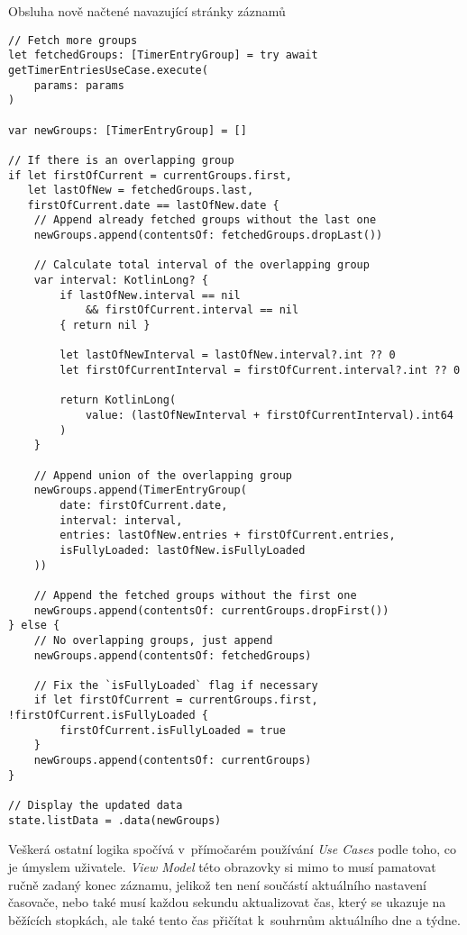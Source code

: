 \begin{listing}
\caption{Obsluha nově načtené navazující stránky záznamů}\label{code:view-mode-entry-group-overlap}
\begin{verbatim}
// Fetch more groups
let fetchedGroups: [TimerEntryGroup] = try await getTimerEntriesUseCase.execute(
    params: params
)

var newGroups: [TimerEntryGroup] = []

// If there is an overlapping group
if let firstOfCurrent = currentGroups.first,
   let lastOfNew = fetchedGroups.last,
   firstOfCurrent.date == lastOfNew.date {
    // Append already fetched groups without the last one
    newGroups.append(contentsOf: fetchedGroups.dropLast())
    
    // Calculate total interval of the overlapping group
    var interval: KotlinLong? {
        if lastOfNew.interval == nil 
            && firstOfCurrent.interval == nil 
        { return nil }
        
        let lastOfNewInterval = lastOfNew.interval?.int ?? 0
        let firstOfCurrentInterval = firstOfCurrent.interval?.int ?? 0
        
        return KotlinLong(
            value: (lastOfNewInterval + firstOfCurrentInterval).int64
        )
    }
    
    // Append union of the overlapping group
    newGroups.append(TimerEntryGroup(
        date: firstOfCurrent.date,
        interval: interval,
        entries: lastOfNew.entries + firstOfCurrent.entries,
        isFullyLoaded: lastOfNew.isFullyLoaded
    ))
    
    // Append the fetched groups without the first one
    newGroups.append(contentsOf: currentGroups.dropFirst())
} else {
    // No overlapping groups, just append
    newGroups.append(contentsOf: fetchedGroups)
    
    // Fix the `isFullyLoaded` flag if necessary
    if let firstOfCurrent = currentGroups.first, !firstOfCurrent.isFullyLoaded {
        firstOfCurrent.isFullyLoaded = true
    }
    newGroups.append(contentsOf: currentGroups)
}

// Display the updated data
state.listData = .data(newGroups)
\end{verbatim}
\end{listing}

Veškerá ostatní logika spočívá v~přímočarém používání \emph{Use Cases} podle toho, co je úmyslem uživatele. \emph{View Model} této obrazovky si mimo to musí pamatovat ručně zadaný konec záznamu, jelikož ten není součástí aktuálního nastavení časovače, nebo také musí každou sekundu aktualizovat čas, který se ukazuje na běžících stopkách, ale také tento čas přičítat k~souhrnům aktuálního dne a týdne.

